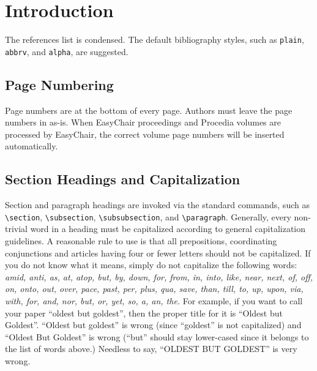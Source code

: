 \documentclass[a4paper]{easychair}
\begin{document}
\section{Introduction}
\label{sect:introduction}

The references list is condensed. The default bibliography styles, such as
\texttt{plain}, \texttt{abbrv}, and \texttt{alpha}, are suggested.

\subsection{Page Numbering}
\label{sect:page-numbering}

Page numbers are at the bottom of every page. Authors must leave the
page numbers in as-is. When EasyChair proceedings and Procedia volumes are processed by
EasyChair, the correct volume page numbers will be inserted
automatically.

\subsection{Section Headings and Capitalization}
\label{sect:section-headings}

Section and paragraph headings are invoked via the standard 
commands, such as
\verb+\section+,
\verb+\subsection+,
\verb+\subsubsection+, and
\verb+\paragraph+.
Generally, every non-trivial word in a heading must be capitalized according to
general capitalization guidelines. A reasonable rule to use is that
all prepositions, coordinating conjunctions and articles having four
or fewer letters should not be capitalized. If you do not know what it
means, simply do not capitalize the following words:
\textit{amid, anti, as, at, atop, but, by, down, for, from, in, into, like,
near, next, of, off, on, onto, out, over, pace, past, per, plus, qua,
save, than, till, to, up, upon, via, with, for, and, nor, but, or,
yet, so, a, an, the.} For example, if you want to call your paper
``oldest but goldest'', then the proper title for it is ``Oldest but
Goldest''. ``Oldest but goldest'' is wrong (since ``goldest'' is not
capitalized) and ``Oldest But Goldest'' is wrong (``but'' should stay
lower-cased since it belongs to the list of words above.) Needless to
say, ``OLDEST BUT GOLDEST'' is very wrong.
\end{document}

